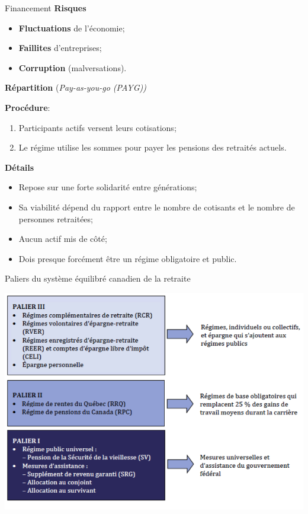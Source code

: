 \documentclass[10pt, french]{article}
\begin{document}
\begin{multicols*}{3}
\begin{conceptgen}{Financement}
\textbf{Risques}
\begin{itemize}[leftmargin = *]
	\item	\textbf{Fluctuations} de l'économie;
	\item	\textbf{Faillites} d'entreprises;
	\item	\textbf{Corruption} (malversations).
\end{itemize}

\tcbline

\begin{center}
\textbf{Répartition} (\textit{Pay-as-you-go (PAYG))}
\end{center}

\textbf{Procédure}:
\begin{enumerate}[leftmargin = *]
	\item	Participants actifs versent leurs cotisations;
	\item	Le régime utilise les sommes pour payer les pensions des retraités actuels.
\end{enumerate}

\textbf{Détails}
\begin{itemize}[leftmargin = *]
	\item	Repose sur une forte solidarité entre générations;
	\item	Sa viabilité dépend du rapport entre le nombre de cotisants et le nombre de personnes retraitées;
	\item	Aucun actif mis de côté;
	\item	Dois presque forcément être un régime obligatoire et public.
\end{itemize}
\end{conceptgen}

\begin{conceptgen}{Paliers du système équilibré canadien de la retraite}
\centerline{\includegraphics[scale=0.25]{src/ACT-1005/retraite-paliers.png}}


\end{conceptgen}
\end{multicols*}
\end{document}
